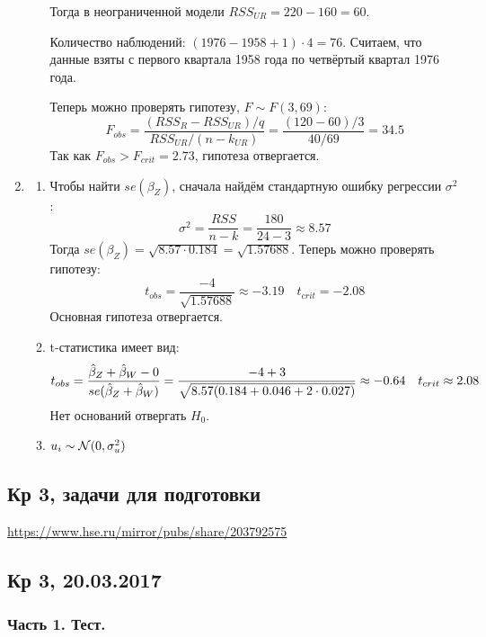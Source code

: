 \documentclass[12pt, a4paper]{article}\usepackage[]{graphicx}\usepackage[]{color}
\begin{document}
\begin{enumerate}
\begin{enumerate}
Тогда в неограниченной модели $RSS_{UR} = 220 - 160 = 60$.

Количество наблюдений: $(1976-1958+1)\cdot 4 = 76$. Считаем, что данные взяты с первого квартала 1958 года по четвёртый квартал 1976 года.

Теперь можно проверять гипотезу, $F \sim F(3, 69)$:
\[
F_{obs} = \frac{(RSS_{R} - RSS_{UR}) / q}{RSS_{UR}/(n-k_{UR})} = \frac{(120 - 60) / 3}{40/69} = 34.5
\]
Так как $F_{obs} > F_{crit} = 2.73$, гипотеза отвергается.
\end{enumerate}

\item
\begin{enumerate}
\item Чтобы найти $se(\beta_Z)$, сначала найдём стандартную ошибку регрессии $\sigma^2$:
\[
\sigma^2 = \frac{RSS}{n-k} = \frac{180}{24-3} \approx 8.57
\]
Тогда $se(\beta_Z) = \sqrt{8.57 \cdot 0.184} = \sqrt{1.57688}$. Теперь можно проверять гипотезу:
\[
t_{obs} = \frac{-4}{\sqrt{1.57688}} \approx -3.19 \quad t_{crit} = -2.08
\]
Основная гипотеза отвергается.
\item t-статистика имеет вид:
\[
t_{obs} = \frac{\hat{\beta}_Z + \hat{\beta}_W - 0}{se(\hat{\beta}_Z + \hat{\beta}_W)} = \frac{-4 + 3}{\sqrt{8.57(0.184 + 0.046 + 2 \cdot 0.027)}} \approx -0.64 \quad t_{crit} \approx 2.08
\]
Нет оснований отвергать $H_0$.
\item $u_i \sim \mathcal{N}(0, \sigma_u^2)$
\end{enumerate}
\end{enumerate}


\subsection{Кр 3, задачи для подготовки}

\url{https://www.hse.ru/mirror/pubs/share/203792575}

\subsection{Кр 3, 20.03.2017}


\subsubsection*{Часть 1. Тест.}
\end{document}
